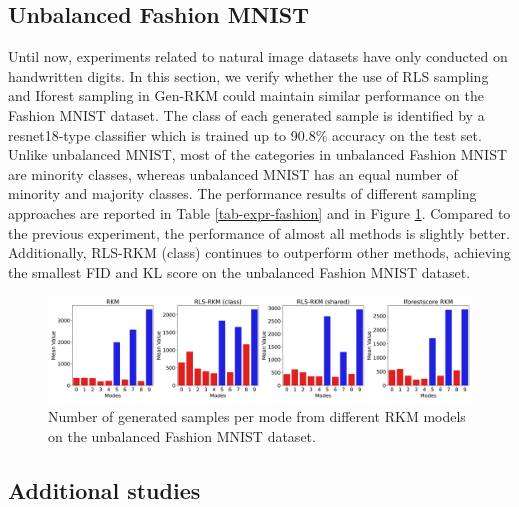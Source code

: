 \subsection{Unbalanced Fashion MNIST}
\label{subsec-expr-Fashion}
Until now, experiments related to natural image datasets have only conducted on handwritten digits. In this section, we verify whether the use of RLS sampling and Iforest sampling in Gen-RKM could maintain similar performance on the Fashion MNIST dataset. The class of each generated sample is identified by a resnet18-type classifier which is trained up to 90.8\% accuracy on the test set. Unlike unbalanced MNIST, most of the categories in unbalanced Fashion MNIST are minority classes, whereas unbalanced MNIST has an equal number of minority and majority classes. The performance results of different sampling approaches are reported in Table \ref{tab-expr-fashion} and in Figure \ref{fig-rls-gen-dist-fashion}. Compared to the previous experiment, the performance of almost all methods is slightly better. Additionally, RLS-RKM (class) continues to outperform other methods, achieving the smallest FID and KL score on the unbalanced Fashion MNIST dataset.


\begin{figure}[ht]
    \centering
    \includegraphics[width=0.9\linewidth]{Figures/Methods/expr-rls-fashion-gen-dist.png}
    \caption{Number of generated samples per mode from different RKM models on the unbalanced Fashion MNIST dataset.}
    \label{fig-rls-gen-dist-fashion}
\end{figure}

\subsection{Additional studies}
\label{subsec-additional-studies}

